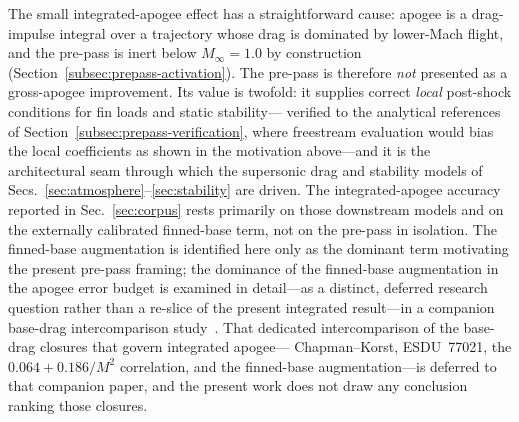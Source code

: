 The small integrated-apogee effect has a straightforward cause: apogee is a
drag-impulse integral over a trajectory whose drag is dominated by lower-Mach
flight, and the pre-pass is inert below $M_\infty = 1.0$ by construction
(Section~\ref{subsec:prepass-activation}). The pre-pass is therefore \emph{not}
presented as a gross-apogee improvement. Its value is twofold: it supplies
correct \emph{local} post-shock conditions for fin loads and static stability---%
verified to the analytical references of
Section~\ref{subsec:prepass-verification}, where freestream evaluation would bias
the local coefficients as shown in the motivation above---and it is the
architectural seam through which the supersonic drag and stability models of
Secs.~\ref{sec:atmosphere}--\ref{sec:stability} are driven. The integrated-apogee accuracy reported in Sec.~\ref{sec:corpus}
rests primarily on those downstream models and on the externally calibrated
finned-base term, not on the pre-pass in isolation. The finned-base
augmentation is identified here only as the dominant term motivating the
present pre-pass framing; the dominance of the finned-base augmentation in the
apogee error budget is examined in detail---as a distinct, deferred research
question rather than a re-slice of the present integrated result---in a
companion base-drag intercomparison study~\cite{yu2026ast}. That dedicated
intercomparison of the base-drag closures that govern integrated apogee---%
Chapman--Korst, ESDU~77021, the $0.064 + 0.186/M^2$ correlation, and the
finned-base augmentation---is deferred to that companion paper, and the present
work does not draw any conclusion ranking those closures.
